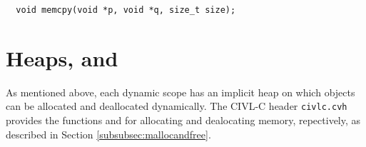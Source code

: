 \begin{verbatim}
  void memcpy(void *p, void *q, size_t size);
\end{verbatim}

\section{Heaps, \cmalloc{} and \cfree}

As mentioned above, each dynamic scope has an implicit heap on which
objects can be allocated and deallocated dynamically.  The CIVL-C header
\texttt{civlc.cvh} provides the functions \cmalloc{} and \cfree{} for allocating and dealocating
memory, repectively, as described in Section \ref{subsubsec:mallocandfree}.





